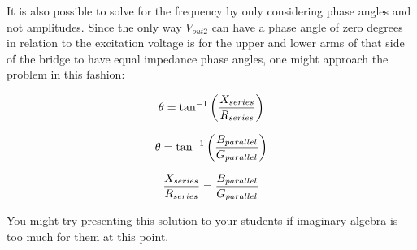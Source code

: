 It is also possible to solve for the frequency by only considering phase angles and not amplitudes.  Since the only way $V_{out2}$ can have a phase angle of zero degrees in relation to the excitation voltage is for the upper and lower arms of that side of the bridge to have equal impedance phase angles, one might approach the problem in this fashion:

$$\theta = \tan^{-1} \left( {X_{series} \over R_{series}} \right)$$

$$\theta = \tan^{-1} \left( {B_{parallel} \over G_{parallel}} \right)$$

$${X_{series} \over R_{series}} = {B_{parallel} \over G_{parallel}}$$

You might try presenting this solution to your students if imaginary algebra is too much for them at this point.




